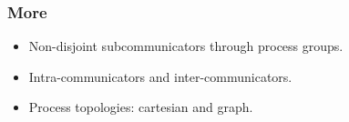 \begin{frame}[containsverbatim]\frametitle{More}
  \begin{itemize}
  \item Non-disjoint subcommunicators through process groups.
  \item Intra-communicators and inter-communicators.
  \item Process topologies: cartesian and graph.
  \end{itemize}
\end{frame}

\endinput

\begin{frame}[containsverbatim]\frametitle{}
\begin{lstlisting}
  
\end{lstlisting}
\end{frame}

